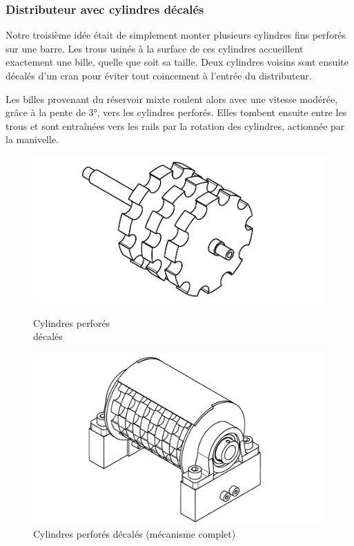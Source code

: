 \subsubsection{Distributeur avec cylindres décalés}
Notre troisième idée était de simplement monter plusieurs cylindres fins perforés sur une barre. Les trous usinés à la surface de ces cylindres accueillent exactement une bille, quelle que soit sa taille. Deux cylindres voisins sont ensuite décalés d'un cran pour éviter tout coincement à l'entrée du distributeur.

Les billes provenant du réservoir mixte roulent alors avec une vitesse modérée, grâce à la pente de \ang{3}, vers les cylindres perforés. Elles tombent ensuite entre les trous et sont entraînées vers les rails par la rotation des cylindres, actionnée par la manivelle.

\begin{figure}[h]
    \begin{minipage}[c]{0.45\linewidth}
        \centerfloat
        \includegraphics[width=1.4\linewidth]{Graphics/Images_concepts_Leon/ROUE_SUR_BARRE.pdf}
        \caption{Cylindres perforés \\ décalés}
    \end{minipage}
    \hfill
    \begin{minipage}[c]{0.45\linewidth}
        \centerfloat
        \includegraphics[width=1.3\linewidth]{Graphics/Images_concepts_Leon/ASSEMBLAGE_LOURD.pdf}
        \caption{Cylindres perforés décalés (mécanisme complet)}
    \end{minipage}
\end{figure}

